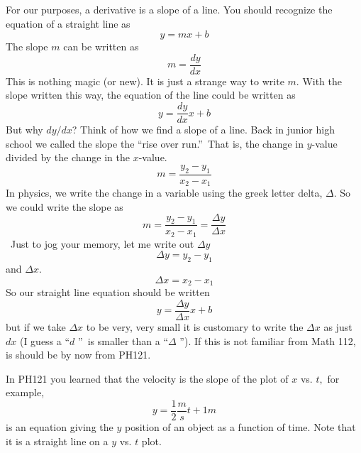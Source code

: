 For our purposes, a derivative is a slope of a line. You should recognize
the equation of a straight line as%
\begin{equation*}
y=mx+b
\end{equation*}%
The slope $m$ can be written as 
\begin{equation*}
m=\frac{dy}{dx}
\end{equation*}%
This is nothing magic (or new). It is just a strange way to write $m.$ With
the slope written this way, the equation of the line could be written as 
\begin{equation*}
y=\frac{dy}{dx}x+b
\end{equation*}%
But why $dy/dx$? Think of how we find a slope of a line. Back in junior high
school we called the slope the \textquotedblleft rise over
run.\textquotedblright\ That is, the change in $y$-value divided by the
change in the $x$-value.%
\begin{equation*}
m=\frac{y_{2}-y_{1}}{x_{2}-x_{1}}
\end{equation*}%
In physics, we write the change in a variable using the greek letter delta, $%
\Delta .$ So we could write the slope as%
\begin{equation*}
m=\frac{y_{2}-y_{1}}{x_{2}-x_{1}}=\frac{\Delta y}{\Delta x}
\end{equation*}%
\ Just to jog your memory, let me write out $\Delta y$%
\begin{equation*}
\Delta y=y_{2}-y_{1}
\end{equation*}%
and $\Delta x.$ 
\begin{equation*}
\Delta x=x_{2}-x_{1}
\end{equation*}%
So our straight line equation should be written 
\begin{equation*}
y=\frac{\Delta y}{\Delta x}x+b
\end{equation*}%
but if we take $\Delta x$ to be very, very small it is customary to write
the $\Delta x$ as just $dx$ (I guess a \textquotedblleft $d$%
\textquotedblright\ is smaller than a \textquotedblleft $\Delta $%
\textquotedblright ). If this is not familiar from Math 112, is should be by
now from PH121.

In PH121 you learned that the velocity is the slope of the plot of $x$ vs. $%
t,$ for example, 
\begin{equation*}
y=\frac{1}{2}\frac{\unit{m}}{\unit{s}}t+1\unit{m}
\end{equation*}%
is an equation giving the $y$ position of an object as a function of time.
Note that it is a straight line on a $y$ vs. $t$ plot. 

